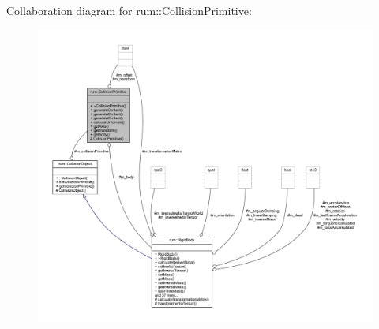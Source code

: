Collaboration diagram for rum\+:\+:Collision\+Primitive\+:\nopagebreak
\begin{figure}[H]
\begin{center}
\leavevmode
\includegraphics[width=350pt]{classrum_1_1_collision_primitive__coll__graph}
\end{center}
\end{figure}
